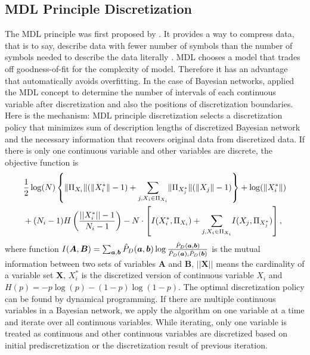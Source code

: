 \subsection{MDL Principle Discretization}
\label{MDL}
The MDL principle was first proposed by \cite{MDL_1978}. It provides a way to compress data, that is to say, describe data with fewer number of symbols than the number of symbols needed to describe the data literally \citep{Grunwald_2009}. MDL chooses a model that trades off goodness-of-fit for the complexity of model. Therefore it has an advantage that automatically avoids overfitting. In the case of Bayesian networks, \cite{Friedman_1996} applied the MDL concept to determine the number of intervals of each continuous variable after discretization and also the positions of discretization boundaries. Here is the mechanism: MDL principle discretization selects a discretization policy that minimizes sum of description lengths of discretized Bayesian network and the necessary information that recovers original data from discretized data. If there is only one continuous variable and other variables are discrete, the objective function is  
\begin{equation}
\begin{aligned}
&{1 \over 2} \log(N) \left\lbrace  \lVert \Pi_{X_i} \rVert (\lVert X^*_i \rVert - 1) +
 {\sum_{j,X_i \in \Pi_{X_i}}} \lVert \Pi_{X^*_j} \rVert (\lVert X_j \rVert - 1) \right\rbrace + \log(\lVert {X^*_i} \rVert) \\
& + (N_i-1) H \left( {{||X^*_i|| - 1}\over{N_i -1}}  \right) -N \cdot \left[ I(X^*_i,\Pi_{X_i}) + {\sum_{j,X_i \in \Pi_{X_i}}} I(X_j, \Pi_{X^*_j}) \right],
\end{aligned}
\end{equation}
where function $I(\boldsymbol{A},\boldsymbol{B}) = \sum_{\boldsymbol{a},\boldsymbol{b}} \hat{P}_D (\boldsymbol{a},\boldsymbol{b}) \log {{\hat{P}_D (\boldsymbol{a},\boldsymbol{b})}\over{\hat{P}_D (\boldsymbol{a}),\hat{P}_D (\boldsymbol{b})}}$ is the mutual information between two sets of variables $\boldsymbol{A}$ and $\boldsymbol{B}$, $||\boldsymbol{X}||$ means the cardinality of a variable set $\boldsymbol{X}$, $X^*_i$ is the discretized version of continuous variable $X_i$ and $H(p) = -p \log(p) - (1-p) \log(1-p)$. The optimal discretization policy can be found by dynamical programming. If there are multiple continuous variables in a Bayesian network, we apply the algorithm on one variable at a time and iterate over all continuous variables. While iterating, only one variable is treated as continuous and other continuous variables are discretized based on initial prediscretization or the discretization result of previous iteration.

